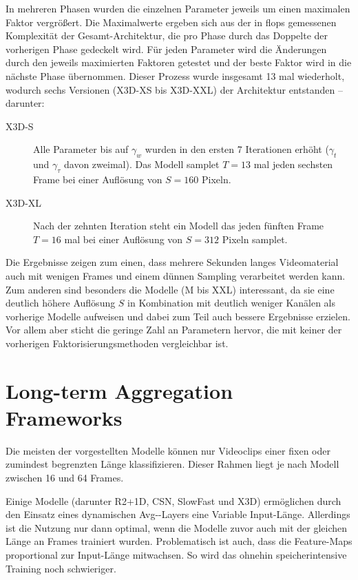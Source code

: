 In mehreren Phasen wurden die einzelnen Parameter jeweils um einen maximalen Faktor vergrößert.
Die Maximalwerte ergeben sich aus der in \gls{flops} gemessenen Komplexität der Gesamt-Architektur, die pro Phase durch das Doppelte der vorherigen Phase gedeckelt wird.
Für jeden Parameter wird die Änderungen durch den jeweils maximierten Faktoren getestet und der beste Faktor wird in die nächste Phase übernommen.
Dieser Prozess wurde insgesamt 13 mal wiederholt, wodurch sechs Versionen (X3D-XS bis X3D-XXL) der Architektur entstanden -- darunter:

\begin{description}
    \item[X3D-S] Alle Parameter bis auf $\gamma_w$ wurden in den ersten 7 Iterationen erhöht ($\gamma_t$ und $\gamma_\tau$ davon zweimal).
    Das Modell samplet $T=13$ mal jeden sechsten Frame bei einer Auflösung von $S=160$ Pixeln.
    \item[X3D-XL] Nach der zehnten Iteration steht ein Modell das jeden fünften Frame $T=16$ mal bei einer Auflösung von $S=312$ Pixeln samplet.
\end{description}

Die Ergebnisse zeigen zum einen, dass mehrere Sekunden langes Videomaterial auch mit wenigen Frames und einem dünnen Sampling verarbeitet werden kann.
Zum anderen sind besonders die Modelle (M bis XXL) interessant, da sie eine deutlich höhere Auflösung $S$ in Kombination mit deutlich weniger Kanälen als vorherige Modelle aufweisen und dabei zum Teil auch bessere Ergebnisse erzielen.
Vor allem aber sticht die geringe Zahl an Parametern hervor, die mit keiner der vorherigen Faktorisierungsmethoden vergleichbar ist.


\section{Long-term Aggregation Frameworks}
\label{sec:long-term-aggregation-frameworks}

Die meisten der vorgestellten Modelle können nur Videoclips einer fixen oder zumindest begrenzten Länge klassifizieren.
Dieser Rahmen liegt je nach Modell zwischen 16 und 64 Frames.

Einige Modelle (darunter R2+1D, CSN, SlowFast und X3D) ermöglichen durch den Einsatz eines dynamischen Avg-\pool-Layers eine Variable Input-Länge.
Allerdings ist die Nutzung nur dann optimal, wenn die Modelle zuvor auch mit der gleichen Länge an Frames trainiert wurden.
Problematisch ist auch, dass die Feature-Maps proportional zur Input-Länge mitwachsen.
So wird das ohnehin speicherintensive Training noch schwieriger.


